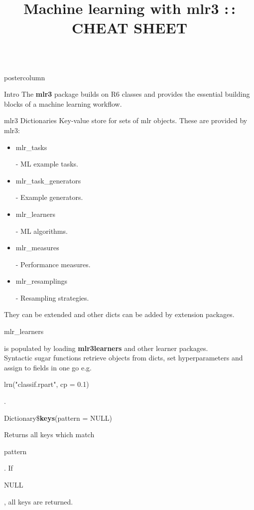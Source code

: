 \documentclass{beamer}
\title{Machine learning with mlr3 :\,: CHEAT SHEET} %
\newlength{\columnheight} %
\newcommand{\codeinline}[1]{\begin{codeboxinline}#1\end{codeboxinline}}
\begin{document}
\begin{frame}[fragile]{}
	\begin{columns}
		\begin{column}{.245\textwidth}
			\begin{beamercolorbox}[center]{postercolumn}
				\begin{minipage}{.98\textwidth}
					\parbox[t][\columnheight]{\textwidth}{
						\begin{myblock}{Intro}
							The \textbf{mlr3} package builds on R6 classes and provides the essential building
							blocks of a machine learning workflow.
						\end{myblock}
						\begin{myblock}{mlr3 Dictionaries}
                            Key-value store for sets of mlr objects. These are provided by mlr3: 
							\vspace{0.5em}
							\begin{itemize}
								\item \codeinline{mlr\_tasks} - ML example tasks.
								\item \codeinline{mlr\_task\_generators} - Example generators.
                                \item \codeinline{mlr\_learners} - ML algorithms. 
								\item \codeinline{mlr\_measures} - Performance measures.
								\item \codeinline{mlr\_resamplings} - Resampling strategies.
							\end{itemize}
							\vspace{0.5em}
                            They can be extended and other dicts can be added by extension packages.
                            \codeinline{mlr\_learners} is populated by loading \textbf{mlr3learners} and other learner packages.
                            \vspace{1em}
                            \\
                            Syntactic sugar functions retrieve objects from dicts, set hyperparameters and assign to fields in one go e.g.
                            \codeinline{lrn("classif.rpart", cp = 0.1)}.
							\\
							\begin{codebox}
								Dictionary\$\textbf{keys}(pattern = NULL)
							\end{codebox}
							Returns all keys which match \codeinline{pattern}. 
							If \codeinline{NULL}, all keys are returned. 
							\\

\end{myblock}}
\end{minipage}
\end{beamercolorbox}
\end{column}
\end{columns}
\end{frame}
\end{document}
